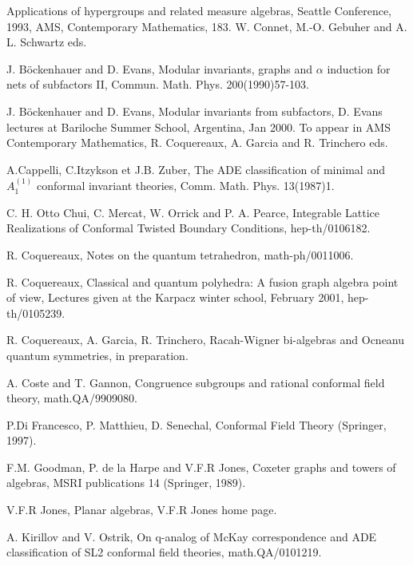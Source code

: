 \documentclass[a4paper,11pt]{article}
\begin{document}


\begin{thebibliography}{99}

 Applications of hypergroups and related
measure algebras, Seattle Conference, 1993, AMS, Contemporary
Mathematics, 183. W. Connet, M.-O. Gebuher and A. L. Schwartz eds.

 J. B\"ockenhauer and D. Evans, Modular invariants, graphs and $\alpha$ induction for nets of subfactors II,
Commun. Math. Phys. 200(1990)57-103.

 J. B\"ockenhauer and D. Evans, Modular invariants from subfactors, D. Evans lectures at Bariloche Summer School,
Argentina, Jan 2000. To appear in AMS Contemporary Mathematics, R. Coquereaux, A. Garcia and R. Trinchero eds.

 A.Cappelli, C.Itzykson et J.B. Zuber, The
ADE classification of minimal and $A_1^{(1)}$ conformal invariant
theories, Comm. Math. Phys. 13(1987)1.

 C. H. Otto Chui, C. Mercat, W. Orrick and P. A. Pearce, Integrable Lattice 
Realizations of Conformal Twisted Boundary Conditions, hep-th/0106182.

 R. Coquereaux, Notes on the quantum
tetrahedron, math-ph/0011006.

 R. Coquereaux, Classical and quantum
polyhedra: A fusion graph algebra point of view, Lectures given at
the Karpacz winter school, February 2001, hep-th/0105239. 

 R. Coquereaux, A. Garcia, R. Trinchero,
Racah-Wigner bi-algebras and Ocneanu quantum symmetries, in preparation.

 A. Coste and T. Gannon, Congruence subgroups and rational conformal field theory, math.QA/9909080.

 P.Di Francesco, P. Matthieu, D. Senechal, Conformal Field Theory (Springer, 1997).

 F.M. Goodman, P. de la Harpe and V.F.R Jones, Coxeter graphs and towers of algebras, MSRI publications 14 (Springer, 1989).

 V.F.R Jones, Planar algebras, V.F.R
Jones home page.

 A. Kirillov and V. Ostrik, On q-analog
of McKay correspondence and ADE classification of SL2 conformal field
theories, math.QA/0101219.



\end{thebibliography}
\end{document}
